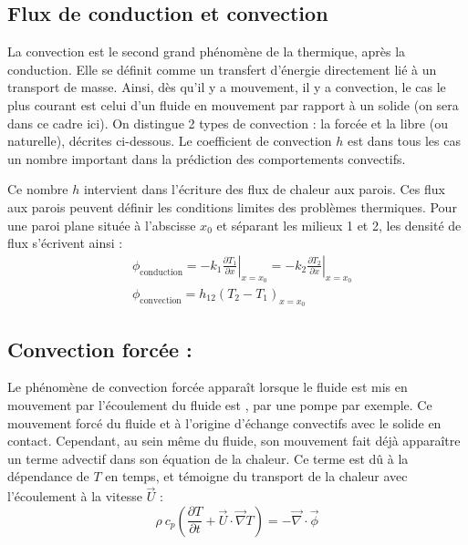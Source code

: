 

\subsection{Flux de conduction et convection}
La convection est le second grand phénomène de la thermique, après la conduction. Elle se définit comme un transfert d'énergie directement lié à un transport de masse. Ainsi, dès qu'il y a mouvement, il y a convection, le cas le plus courant est celui d'un fluide en mouvement par rapport à un solide (on sera dans ce cadre ici). On distingue 2 types de convection : la forcée et la libre (ou naturelle), décrites ci-dessous. Le coefficient de convection $h$ est dans tous les cas un nombre important dans la prédiction des comportements convectifs.

Ce nombre $h$ intervient dans l'écriture des flux de chaleur aux parois. Ces flux aux parois peuvent définir les conditions limites des problèmes thermiques. Pour une paroi plane située à l'abscisse $x_0$ et séparant les milieux 1 et 2, les densité de flux s'écrivent ainsi :
%
\begin{align}[left=\empheqlbrace]
 &\phi_{\text{conduction}}
 = - k_1 \left. \frac{\partial{T_1}}{\partial{x}} \right|_{x=x_0}
 = - k_2 \left. \frac{\partial{T_2}}{\partial{x}} \right|_{x=x_0} \\
 &\phi_{\text{convection}}
 = h_{12} \left( T_2 - T_1 \right)_{x=x_0}
 \label{eq:fluxth}
\end{align}


\subsection{Convection forcée :}
Le phénomène de convection forcée apparaît lorsque le fluide est mis en mouvement par
l'écoulement du fluide est , par une pompe par exemple. Ce mouvement forcé du fluide et à l'origine d'échange convectifs avec le solide en contact. Cependant, au sein même du fluide, son mouvement fait déjà apparaître un terme advectif dans son équation de la chaleur. Ce terme est dû à la dépendance de $T$ en temps, et témoigne du transport de la chaleur avec l'écoulement à la vitesse $\vec{U}$ :
%
\begin{equation}
\rho~c_{p} \left( \frac{\partial T}{\partial t}
+ \vec{U} \cdot \vec{\nabla} T \right)
= - \vec{\nabla} \cdot \vec{\phi}
\end{equation}

